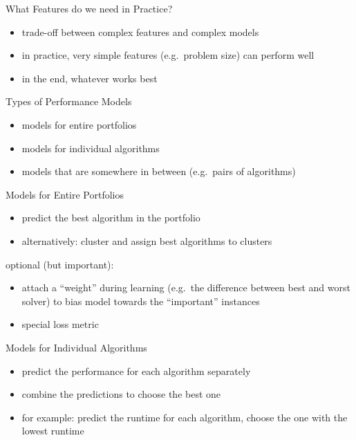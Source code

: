 \begin{frame}{What Features do we need in Practice?}
\begin{itemize}
\item trade-off between complex features and complex models
\item in practice, very simple features (e.g.\ problem size) can perform well
\item in the end, whatever works best
\end{itemize}
\end{frame}

\begin{frame}{Types of Performance Models}
\begin{itemize}
\item models for entire portfolios
\item models for individual algorithms
\item models that are somewhere in between (e.g.\ pairs of algorithms)
\end{itemize}
\end{frame}

\begin{frame}{Models for Entire Portfolios}
\begin{itemize}
\item predict the best algorithm in the portfolio
\item alternatively: cluster and assign best algorithms to clusters
\end{itemize}
optional (but important):
\begin{itemize}
\item attach a ``weight'' during learning (e.g.\ the difference between best
    and worst solver) to bias model towards the ``important'' instances
\item special loss metric
\end{itemize}
\end{frame}

\begin{frame}{Models for Individual Algorithms}
\begin{itemize}
\item predict the performance for each algorithm separately
\item combine the predictions to choose the best one
\item for example: predict the runtime for each algorithm, choose the one with
    the lowest runtime
\end{itemize}
\end{frame}

